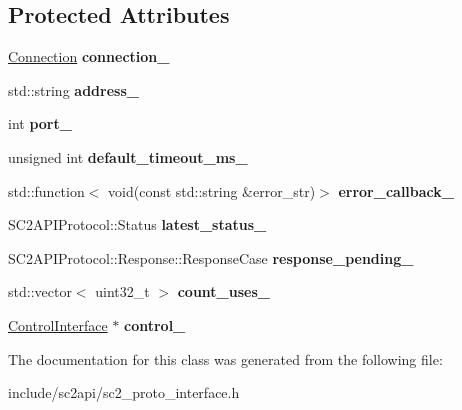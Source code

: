 \subsection*{Protected Attributes}
\begin{DoxyCompactItemize}
\item 
\mbox{\label{classsc2_1_1_proto_interface_a8fdac4b0429cbf86ec7c1edba4e326fc}} 
\hyperlink{classsc2_1_1_connection}{Connection} {\bfseries connection\+\_\+}
\item 
\mbox{\label{classsc2_1_1_proto_interface_a4d79099fa89d4bcc0bb001d27d7a801e}} 
std\+::string {\bfseries address\+\_\+}
\item 
\mbox{\label{classsc2_1_1_proto_interface_a15e1f66ed2cd1c0808f9bf500b81d0e6}} 
int {\bfseries port\+\_\+}
\item 
\mbox{\label{classsc2_1_1_proto_interface_a84700c40de82de13b594ed1efb22a214}} 
unsigned int {\bfseries default\+\_\+timeout\+\_\+ms\+\_\+}
\item 
\mbox{\label{classsc2_1_1_proto_interface_a13b6b03fa93720ba9c5f35791d4d8d45}} 
std\+::function$<$ void(const std\+::string \&error\+\_\+str)$>$ {\bfseries error\+\_\+callback\+\_\+}
\item 
\mbox{\label{classsc2_1_1_proto_interface_a01ca4c71c316152c099be11ba27eb27a}} 
S\+C2\+A\+P\+I\+Protocol\+::\+Status {\bfseries latest\+\_\+status\+\_\+}
\item 
\mbox{\label{classsc2_1_1_proto_interface_a7ce86c185be3b759be60f99d0fd933e1}} 
S\+C2\+A\+P\+I\+Protocol\+::\+Response\+::\+Response\+Case {\bfseries response\+\_\+pending\+\_\+}
\item 
\mbox{\label{classsc2_1_1_proto_interface_a13bdf9947b97df63442346b2f50e2391}} 
std\+::vector$<$ uint32\+\_\+t $>$ {\bfseries count\+\_\+uses\+\_\+}
\item 
\mbox{\label{classsc2_1_1_proto_interface_a7927936b004d254fba365487a1f0dcd9}} 
\hyperlink{classsc2_1_1_control_interface}{Control\+Interface} $\ast$ {\bfseries control\+\_\+}
\end{DoxyCompactItemize}


The documentation for this class was generated from the following file\+:\begin{DoxyCompactItemize}
\item 
include/sc2api/sc2\+\_\+proto\+\_\+interface.\+h\end{DoxyCompactItemize}
